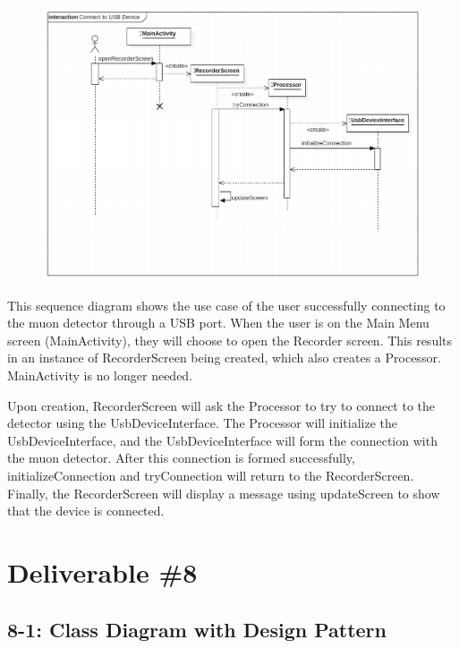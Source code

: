 \documentclass[11pt,a4paper]{article}
\begin{document}
\begin{figure}[h] \hspace{-2cm}
	\includegraphics[width=1.3\textwidth]{sequence2.png}
\end{figure}


This sequence diagram shows the use case of the user successfully connecting to the muon detector through a USB port. When the user is on the Main Menu screen (MainActivity), they will choose to open the Recorder screen. This results in an instance of RecorderScreen being created, which also creates a Processor. MainActivity is no longer needed. 

Upon creation, RecorderScreen will ask the Processor to try to connect to the detector using the UsbDeviceInterface. The Processor will initialize the UsbDeviceInterface, and the UsbDeviceInterface will form the connection with the muon detector. After this connection is formed successfully, initializeConnection and tryConnection will return to the RecorderScreen. Finally, the RecorderScreen will display a message using updateScreen to show that the device is connected.



\newpage
\section*{Deliverable \#8}

\subsection*{8-1: Class Diagram with Design Pattern}
\end{document}
